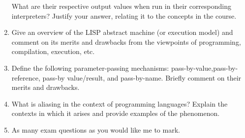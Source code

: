 \begin{enumerate}
    What are their respective output values when run in their corresponding
    interpreters? Justify your answer, relating it to the concepts in the
    course.

  \item Give an overview of the LISP abstract machine (or execution model) and
    comment on its merits and drawbacks from the viewpoints of programming,
    compilation, execution, etc.

  \item Define the following parameter-passing mechanisms:
    pass-by-value,pass-by-reference, pass-by value/result, and pass-by-name.
    Briefly comment on their merits and drawbacks.

  \item What is aliasing in the context of programming languages? Explain the
    contexts in which it arises and provide examples of the phenomenon.

  \item As many exam questions as you would like me to mark.

\end{enumerate}


